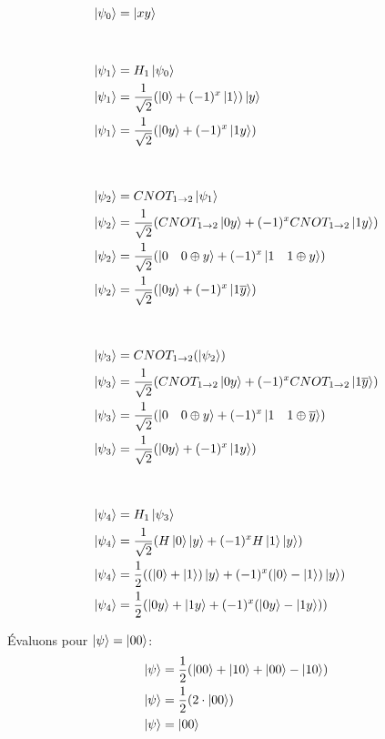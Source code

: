\documentclass{article}
\begin{document}
\begin{align*}
    \ket{\psi_0} &= \ket{xy} \\ \\ \\
    \ket{\psi_1} &= H_1\ket{\psi_0} \\
    \ket{\psi_1} &= \frac{1}{\sqrt{2}}(\ket{0} + (-1)^x\ket{1})\ket{y} \\
    \ket{\psi_1} &= \frac{1}{\sqrt{2}}(\ket{0y} + (-1)^x\ket{1y}) \\ \\ \\
    \ket{\psi_2} &= CNOT_{1\rightarrow2}\ket{\psi_1} \\
    \ket{\psi_2} &= \frac{1}{\sqrt{2}}(CNOT_{1\rightarrow2}\ket{0y} + (-1)^x CNOT_{1\rightarrow2}\ket{1y}) \\
    \ket{\psi_2} &= \frac{1}{\sqrt{2}}(\ket{0 \quad 0 \oplus y} + (-1)^x\ket{1 \quad 1 \oplus y}) \\
    \ket{\psi_2} &= \frac{1}{\sqrt{2}}(\ket{0y} + (-1)^x\ket{1 \overline{y}}) \\ \\ \\
    \ket{\psi_3} &= CNOT_{1\rightarrow2}(\ket{\psi_2}) \\
    \ket{\psi_3} &= \frac{1}{\sqrt{2}}(CNOT_{1\rightarrow2}\ket{0y} + (-1)^x CNOT_{1\rightarrow2}\ket{1\overline{y}}) \\
    \ket{\psi_3} &= \frac{1}{\sqrt{2}}(\ket{0 \quad 0 \oplus y} + (-1)^x \ket{1 \quad 1 \oplus \overline{y}}) \\ 
    \ket{\psi_3} &= \frac{1}{\sqrt{2}}(\ket{0y} + (-1)^x \ket{1y}) \\ \\ \\
    \ket{\psi_4} &= H_1\ket{\psi_3} \\
    \ket{\psi_4} &= \frac{1}{\sqrt{2}}(H\ket{0}\ket{y} + (-1)^xH\ket{1}\ket{y}) \\
    \ket{\psi_4} &= \frac{1}{2}((\ket{0} + \ket{1})\ket{y} + (-1)^x(\ket{0} - \ket{1})\ket{y}) \\
    \ket{\psi_4} &= \frac{1}{2}(\ket{0y} +\ket{1y} + (-1)^x(\ket{0y} - \ket{1y})) \\
\end{align*}

Évaluons pour $\ket{\psi} = \ket{00}$: \\
\begin{align*}
    \ket{\psi} &= \frac{1}{2}(\ket{00} + \ket{10} + \ket{00} - \ket{10}) \\
    \ket{\psi} &= \frac{1}{2}(2\cdot\ket{00}) \\
    \ket{\psi} &= \ket{00}
\end{align*}
\end{document}
